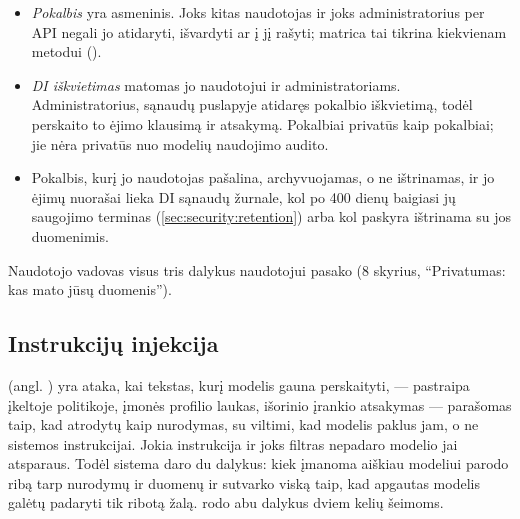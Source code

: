 \begin{itemize}
  \item \emph{Pokalbis} yra asmeninis. Joks kitas naudotojas ir joks administratorius per API
    negali jo atidaryti, išvardyti ar į jį rašyti; matrica tai tikrina kiekvienam metodui
    ().
  \item \emph{DI iškvietimas} matomas jo naudotojui ir administratoriams. Administratorius,
    sąnaudų puslapyje atidaręs pokalbio iškvietimą, todėl perskaito to ėjimo klausimą ir
    atsakymą. Pokalbiai privatūs kaip pokalbiai; jie nėra privatūs nuo modelių naudojimo
    audito.
  \item Pokalbis, kurį jo naudotojas pašalina, archyvuojamas, o ne ištrinamas, ir jo ėjimų
    nuorašai lieka DI sąnaudų žurnale, kol po 400 dienų baigiasi jų saugojimo terminas
    (\cref{sec:security:retention}) arba kol paskyra ištrinama su jos duomenimis.
\end{itemize}

Naudotojo vadovas visus tris dalykus naudotojui pasako (8 skyrius, \enquote{Privatumas: kas
mato jūsų duomenis}).

\subsection{Instrukcijų injekcija}\label{sec:security:ai:injection}

 (angl. ) yra ataka, kai tekstas, kurį
modelis gauna perskaityti, --- pastraipa įkeltoje politikoje, įmonės profilio laukas,
išorinio įrankio atsakymas --- parašomas taip, kad atrodytų kaip nurodymas, su viltimi, kad
modelis paklus jam, o ne sistemos instrukcijai. Jokia instrukcija ir joks filtras nepadaro
modelio jai atsparaus. Todėl sistema daro du dalykus: kiek įmanoma aiškiau modeliui parodo
ribą tarp nurodymų ir duomenų ir sutvarko viską taip, kad apgautas modelis galėtų padaryti
tik ribotą žalą.  rodo abu dalykus dviem kelių šeimoms.

